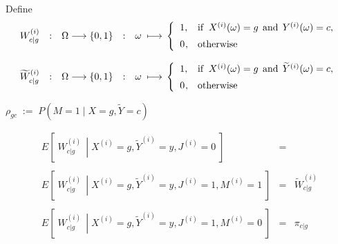 Define
\begin{equation*}
\begin{array}{ccccl}
	W^{(i)}_{c \vert g} &:& \Omega \longrightarrow \{0,1\} &:& \omega\;\longmapsto\,
	\left\{
		\begin{array}{cl}
		1, & \textnormal{if}\;\; X^{(i)}(\omega) = g \,\;\textnormal{and}\;\, Y^{(i)}(\omega) = c,
		\\
		\overset{{\color{white}-}}{0}, & \textnormal{otherwise}
		\end{array}
	\right.
\\ \\
	\widetilde{W}^{(i)}_{c \vert g} &:& \Omega \longrightarrow \{0,1\} &:& \omega\;\longmapsto\,
	\left\{
		\begin{array}{cl}
		1, & \textnormal{if}\;\; X^{(i)}(\omega) = g \,\;\textnormal{and}\;\, \widetilde{Y}^{(i)}(\omega) = c,
		\\
		\overset{{\color{white}-}}{0}, & \textnormal{otherwise}
		\end{array}
	\right.
\end{array}
\end{equation*}

$\rho_{gc} \;:=\; P\!\left(M=1\;\vert\;X=g,\widetilde{Y}=c\right)$

\begin{equation*}
\begin{array}{lcl}
E\!\left[\;\left.W^{(i)}_{c \vert g}\,\;\right\vert\;X^{(i)}=g,\widetilde{Y}^{(i)}=y,J^{(i)}=0\;\right]
&=& 
\\ \\
E\!\left[\;\left.W^{(i)}_{c \vert g}\,\;\right\vert\;X^{(i)}=g,\widetilde{Y}^{(i)}=y,J^{(i)}=1,M^{(i)}=1\;\right]
&=& \widetilde{W}^{(i)}_{c \vert g}
\\ \\
E\!\left[\;\left.W^{(i)}_{c \vert g}\,\;\right\vert\;X^{(i)}=g,\widetilde{Y}^{(i)}=y,J^{(i)}=1,M^{(i)}=0\;\right]
&=& \pi_{c \vert g}
\end{array}
\end{equation*}

